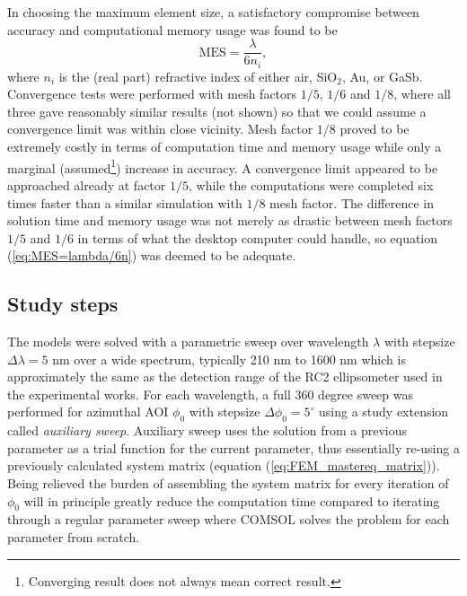 In choosing the maximum element size, a satisfactory compromise between accuracy and computational memory usage was found to be 
\begin{equation}
    \text{MES} = \frac{\lambda}{6n_i},
    \label{eq:MES=lambda/6n}
\end{equation}
where $n_i$ is the (real part) refractive index of either air, SiO$_2$, Au, or GaSb. Convergence tests were performed with mesh factors $1/5$, $1/6$ and $1/8$, where all three gave reasonably similar results (not shown) so that we could assume a convergence limit was within close vicinity. Mesh factor $1/8$ proved to be extremely costly in terms of computation time and memory usage while only a marginal (assumed\footnote{Converging result does not always mean correct result.}) increase in accuracy. A convergence limit appeared to be approached already at factor $1/5$, while the computations were completed six times faster than a similar simulation with $1/8$ mesh factor. The difference in solution time and memory usage was not merely as drastic between mesh factors $1/5$ and $1/6$ in terms of what the desktop computer could handle, so equation (\ref{eq:MES=lambda/6n}) was deemed to be adequate.


\subsection{Study steps}
The models were solved with a parametric sweep over wavelength $\lambda$ with stepsize $\Delta\lambda=5$ nm over a wide spectrum, typically 210 nm to 1600 nm which is approximately the same as the detection range of the RC2 ellipsometer used in the experimental works. For each wavelength, a full 360 degree sweep was performed for azimuthal AOI $\phi_0$ with stepsize $\Delta\phi_0=5^{\circ}$ using a study extension called \emph{auxiliary sweep}. Auxiliary sweep uses the solution from a previous parameter as a trial function for the current parameter, thus essentially re-using a previously calculated system matrix (equation (\ref{eq:FEM_mastereq_matrix})). Being relieved the burden of assembling the system matrix for every iteration of $\phi_0$ will in principle greatly reduce the computation time compared to iterating through a regular parameter sweep where COMSOL solves the problem for each parameter from scratch. 

